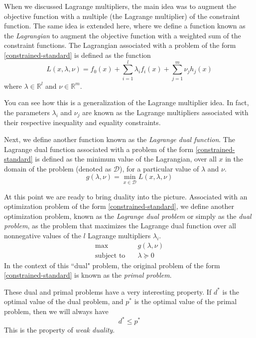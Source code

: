 \documentclass[a4paper]{article}
\theoremstyle{definition}
\begin{document}
When we discussed Lagrange multipliers, the main idea was to augment the objective function with a multiple (the Lagrange multiplier) of the constraint function.
The same idea is extended here, where we define a function known as the \textit{Lagrangian} to augment the objective function with a weighted sum of the constraint functions.
The Lagrangian associated with a problem of the form \eqref{constrained-standard} is defined as the function
\begin{equation}
	\label{lagrangian}
	L(x, \lambda, \nu) = f_0(x) + \sum_{i=1}^{l} \lambda_i f_i(x) + \sum_{j=1}^m \nu_j h_j(x)
\end{equation}
where $\lambda \in \mathbb{R}^l$ and $\nu \in \mathbb{R}^m$.

You can see how this is a generalization of the Lagrange multiplier idea.
In fact, the parameters $\lambda_i$ and $\nu_j$ are known as the Lagrange multipliers associated with their respective inequality and equality constraints.

Next, we define another function known as the \textit{Lagrange dual function}.
The Lagrange dual function associated with a problem of the form \eqref{constrained-standard} is defined as the minimum value of the Lagrangian, over all $x$ in the domain of the problem (denoted as $\mathcal{D}$), for a particular value of $\lambda$ and $\nu$.
\begin{equation}
	\label{lagrange-dual-function}
	g(\lambda, \nu) = \min_{x \in \mathcal{D}} L(x, \lambda, \nu)
\end{equation}

At this point we are ready to bring duality into the picture.
Associated with an optimization problem of the form \eqref{constrained-standard}, we define another optimization problem, known as the \textit{Lagrange dual problem} or simply as the \textit{dual problem}, as the problem that maximizes the Lagrange dual function over all nonnegative values of the $l$ Lagrange multipliers $\lambda_i$.
\begin{equation}
	\label{dual-problem}
	\begin{aligned}
		\max \quad & g(\lambda, \nu) \\
		\text{subject to} \quad & \lambda \succeq 0
	\end{aligned}
\end{equation}
In the context of this ``dual" problem, the original problem of the form \eqref{constrained-standard} is known as the \textit{primal problem}.

These dual and primal problems have a very interesting property. If $d^*$ is the optimal value of the dual problem, and $p^*$ is the optimal value of the primal problem, then we will always have
\begin{equation}
	\label{weak-duality}
	d^* \leq p^*
\end{equation}
This is the property of \textit{weak duality}.
\end{document}
